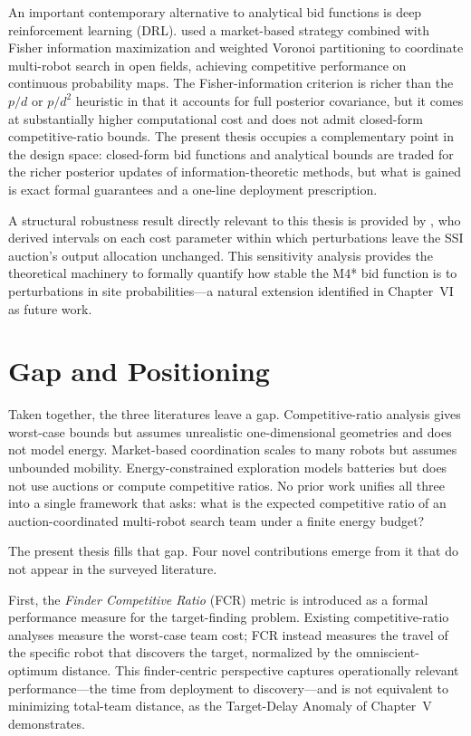 \begin{doublespacing}
An important contemporary alternative to analytical bid functions is
deep reinforcement learning (DRL). \citet{KimKim2025} used a
market-based strategy combined with Fisher information maximization and
weighted Voronoi partitioning to coordinate multi-robot search in open
fields, achieving competitive performance on continuous probability
maps. The Fisher-information criterion is richer than the $p/d$ or
$p/d^2$ heuristic in that it accounts for full posterior covariance,
but it comes at substantially higher computational cost and does not
admit closed-form competitive-ratio bounds. The present thesis occupies
a complementary point in the design space: closed-form bid functions
and analytical bounds are traded for the richer posterior updates of
information-theoretic methods, but what is gained is exact formal
guarantees and a one-line deployment prescription.

A structural robustness result directly relevant to this thesis is
provided by \citet{AutomaticaAuctions2023}, who derived intervals on
each cost parameter within which perturbations leave the SSI auction's
output allocation unchanged. This sensitivity analysis provides the
theoretical machinery to formally quantify how stable the M4* bid
function is to perturbations in site probabilities---a natural
extension identified in Chapter~VI as future work.

\section{Gap and Positioning}

Taken together, the three literatures leave a gap. Competitive-ratio
analysis gives worst-case bounds but assumes unrealistic
one-dimensional geometries and does not model energy. Market-based
coordination scales to many robots but assumes unbounded mobility.
Energy-constrained exploration models batteries but does not use
auctions or compute competitive ratios. No prior work unifies all
three into a single framework that asks: what is the expected
competitive ratio of an auction-coordinated multi-robot search team
under a finite energy budget?

The present thesis fills that gap. Four novel contributions emerge
from it that do not appear in the surveyed literature.

First, the \emph{Finder Competitive Ratio} (FCR) metric is
introduced as a formal performance measure for the target-finding
problem. Existing competitive-ratio analyses measure the worst-case
team cost; FCR instead measures the travel of the specific robot that
discovers the target, normalized by the omniscient-optimum distance.
This finder-centric perspective captures operationally relevant
performance---the time from deployment to discovery---and is not
equivalent to minimizing total-team distance, as the Target-Delay
Anomaly of Chapter~V demonstrates.


\end{doublespacing}
